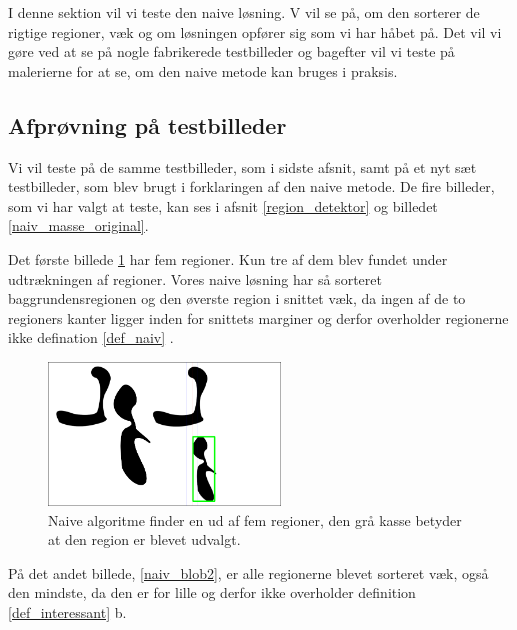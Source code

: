 {\sffamily
I denne sektion vil vi teste den naive løsning. V vil se på, om den
sorterer de rigtige regioner, væk og om løsningen opfører sig som vi
har håbet på. Det vil vi gøre ved at se på nogle fabrikerede
testbilleder og bagefter vil vi teste på malerierne for at se, om den
naive metode kan bruges i praksis.
}
  
\subsection{Afprøvning på testbilleder}
Vi vil teste på de samme testbilleder, som i sidste afsnit, samt på et nyt
sæt testbilleder, som blev brugt i forklaringen af den naive metode. De fire
billeder, som vi har valgt at teste, kan ses i afsnit \ref{region_detektor}
og billedet \ref{naiv_masse_original}.

Det første billede \ref{naiv_blob1} har fem regioner. Kun tre af
dem blev fundet under udtrækningen af regioner. Vores naive løsning har så
sorteret baggrundensregionen og den øverste region i snittet væk, da
ingen af de to regioners kanter ligger inden for snittets marginer og
derfor overholder regionerne ikke defination \ref{def_naiv} . 

\begin{figure}[!h]
	\begin{center}
        \includegraphics[angle=0,width=0.55\textwidth]{afsnit/afprovning/billeder/naive_losning/naiv_blob1.png}
	\end{center}       
	\caption{Naive algoritme finder en ud af fem regioner, den grå kasse
	betyder at den region er blevet udvalgt.}	
	\label{naiv_blob1}
\end{figure}

På det andet billede, \ref{naiv_blob2}, er alle regionerne blevet sorteret væk, også
den mindste, da den er for lille og derfor ikke overholder definition
\ref{def_interessant} b. 

